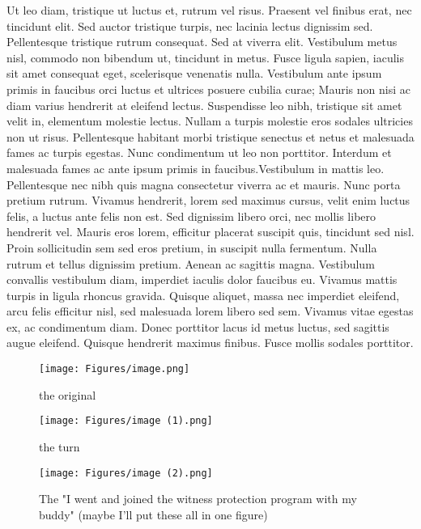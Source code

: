 Ut leo diam, tristique ut luctus et, rutrum vel risus. Praesent vel finibus erat, nec tincidunt elit. Sed auctor tristique turpis, nec lacinia lectus dignissim sed. Pellentesque tristique rutrum consequat. Sed at viverra elit. Vestibulum metus nisl, commodo non bibendum ut, tincidunt in metus. Fusce ligula sapien, iaculis sit amet consequat eget, scelerisque venenatis nulla. Vestibulum ante ipsum primis in faucibus orci luctus et ultrices posuere cubilia curae; Mauris non nisi ac diam varius hendrerit at eleifend lectus. Suspendisse leo nibh, tristique sit amet velit in, elementum molestie lectus. Nullam a turpis molestie eros sodales ultricies non ut risus. Pellentesque habitant morbi tristique senectus et netus et malesuada fames ac turpis egestas. Nunc condimentum ut leo non porttitor. Interdum et malesuada fames ac ante ipsum primis in faucibus.Vestibulum in mattis leo. Pellentesque nec nibh quis magna consectetur viverra ac et mauris. Nunc porta pretium rutrum. Vivamus hendrerit, lorem sed maximus cursus, velit enim luctus felis, a luctus ante felis non est. Sed dignissim libero orci, nec mollis libero hendrerit vel. Mauris eros lorem, efficitur placerat suscipit quis, tincidunt sed nisl. Proin sollicitudin sem sed eros pretium, in suscipit nulla fermentum. Nulla rutrum et tellus dignissim pretium. Aenean ac sagittis magna. Vestibulum convallis vestibulum diam, imperdiet iaculis dolor faucibus eu. Vivamus mattis turpis in ligula rhoncus gravida. Quisque aliquet, massa nec imperdiet eleifend, arcu felis efficitur nisl, sed malesuada lorem libero sed sem. Vivamus vitae egestas ex, ac condimentum diam. Donec porttitor lacus id metus luctus, sed sagittis augue eleifend. Quisque hendrerit maximus finibus. Fusce mollis sodales porttitor.

    \begin{figure}[h]
        \centering
        \texttt{[image: Figures/image.png]}
        \caption{the original}
        \label{fig:stm}
    \end{figure}
    \begin{figure}[h]
        \centering
        \texttt{[image: Figures/image (1).png]}
        \caption{the turn}
        \label{fig:stm}
    \end{figure}
    \begin{figure}[h]
        \centering
        \texttt{[image: Figures/image (2).png]}
        \caption{The "I went and joined the witness protection program with my buddy" (maybe I'll put these all in one figure)}
        \label{fig:stm}
    \end{figure}

